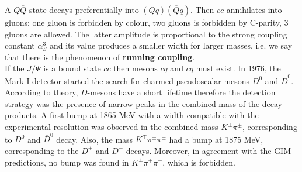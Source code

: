 \documentclass[10.75pt,a4paper,openright,bottom=2cm]{article}
\begin{document}
A $Q\overline{Q}$ state decays preferentially into $(Q\overline{q})(\overline{Q}q)$. Then $c\overline{c}$ annihilates into gluons: one gluon is forbidden by colour, two gluons is forbidden by C-parity, 3 gluons are allowed. The latter amplitude is proportional to the strong coupling constant $\alpha_S^3$ and its value produces a smaller width for larger masses, i.e. we say that there is the phenomenon of \textbf{running coupling}.\\
If the $J/\Psi$ is a bound state $c\overline{c}$ then mesons $c\overline{q}$ and $\overline{c}q$ must exist. In 1976, the Mark I detector started the search for charmed pseudoscalar mesons $D^0$ and $\overline{D}^0$. According to theory, $D$-mesons have a short lifetime therefore the detection strategy was the presence of narrow peaks in the combined mass of the decay products. A first bump at 1865 MeV with a width compatible with the experimental resolution was observed in the combined mass $K^\pm\pi^\pm$, corresponding to $D^0$ and $\overline{D}^0$ decay. Also, the mass $K^\mp\pi^\pm\pi^\pm$ had a bump at 1875 MeV, corresponding to the $D^+$ and $D^-$ decays. Moreover, in agreement with the GIM predictions, no bump was found in $K^\pm\pi^+\pi^-$, which is forbidden.
\end{document}
